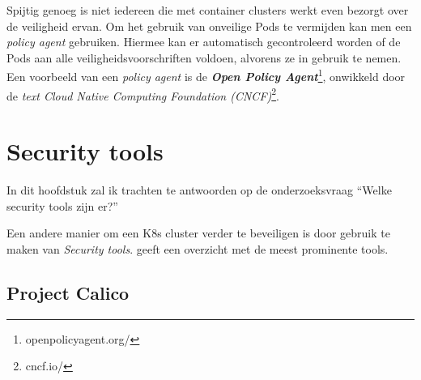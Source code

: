 Spijtig genoeg is niet iedereen die met container clusters werkt even bezorgt over de veiligheid ervan. Om het gebruik van onveilige Pods te vermijden kan men een \textit{policy agent} gebruiken. Hiermee kan er automatisch gecontroleerd worden of de Pods aan alle veiligheidsvoorschriften voldoen, alvorens ze in gebruik te nemen. Een voorbeeld van een \textit{policy agent} is de \textbf{\textit{Open Policy Agent}}\footnote{openpolicyagent.org/}, onwikkeld door de \textit{text Cloud Native Computing Foundation (CNCF)}\footnote{cncf.io/}.

%
%

\section{Security tools} \label{tools}

    In dit hoofdstuk zal ik trachten te antwoorden op de onderzoeksvraag ``Welke security tools zijn er?''

Een andere manier om een K8s cluster verder te beveiligen is door gebruik te maken van \textit{Security tools}.
\textcite{Taylor2019} geeft een overzicht met de meest prominente tools.

\subsection{Project Calico} \label{Calico}

